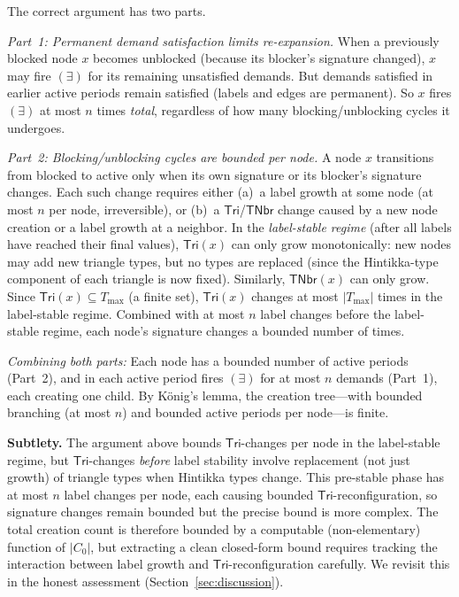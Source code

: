 \documentclass[a4paper,11pt]{article}
\theoremstyle{definition}
\newcommand{\Tri}{\ensuremath{\mathsf{Tri}}}
\newcommand{\TNbr}{\ensuremath{\mathsf{TNbr}}}
\begin{document}
The correct argument has two parts.

\emph{Part~1: Permanent demand satisfaction limits re-expansion.}
When a previously blocked node $x$ becomes unblocked
(because its blocker's signature changed), $x$ may fire
$(\exists)$ for its remaining unsatisfied demands.  But demands
satisfied in earlier active periods remain satisfied (labels and
edges are permanent).  So $x$ fires $(\exists)$ at most $n$ times
\emph{total}, regardless of how many blocking/unblocking cycles
it undergoes.

\emph{Part~2: Blocking/unblocking cycles are bounded per node.}
A node $x$ transitions from blocked to active only when its own
signature or its blocker's signature changes.  Each such change
requires either (a)~a label growth at some node (at most $n$ per
node, irreversible), or (b)~a $\Tri$/$\TNbr$ change caused by a
new node creation or a label growth at a neighbor.  In the
\emph{label-stable regime} (after all labels have reached their
final values), $\Tri(x)$ can only grow monotonically: new nodes
may add new triangle types, but no types are replaced (since the
Hintikka-type component of each triangle is now fixed).  Similarly,
$\TNbr(x)$ can only grow.  Since $\Tri(x) \subseteq T_{\max}$
(a finite set), $\Tri(x)$ changes at most $|T_{\max}|$ times in
the label-stable regime.  Combined with at most $n$ label changes
before the label-stable regime, each node's signature changes a
bounded number of times.

\emph{Combining both parts:} Each node has a bounded number of
active periods (Part~2), and in each active period fires
$(\exists)$ for at most $n$ demands (Part~1), each creating one
child.  By K\"onig's lemma, the creation tree---with bounded
branching (at most $n$) and bounded active periods per
node---is finite.

\medskip\noindent\textbf{Subtlety.}\;
The argument above bounds $\Tri$-changes per node in the
label-stable regime, but $\Tri$-changes \emph{before} label
stability involve replacement (not just growth) of triangle
types when Hintikka types change.  This pre-stable phase has
at most $n$ label changes per node, each causing bounded
$\Tri$-reconfiguration, so signature changes remain bounded
but the precise bound is more complex.  The total creation
count is therefore bounded by a computable (non-elementary)
function of $|C_0|$, but extracting a clean closed-form bound
requires tracking the interaction between label growth and
$\Tri$-reconfiguration carefully.  We revisit this in the
honest assessment (Section~\ref{sec:discussion}).
\end{document}
